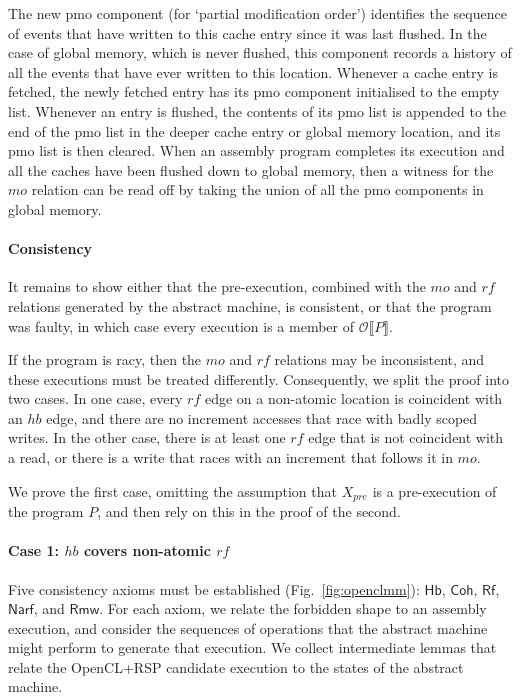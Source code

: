 \documentclass[svgnames,10pt]{sigplanconf}
\theoremstyle{definition}
\newcommand\axiom[1]{\textsf{#1}}
\newcommand\var[1]{\mathit{#1}}
\newcommand\sem[1]{\llbracket #1 \rrbracket}
\newcommand\Hsem[1]{\mathcal{O}\sem{#1}}
\newcommand\rf{\var{rf}}
\newcommand\mo{\var{mo}}
\newcommand\hb{\var{hb}}
\begin{document}
The new $\mathrm{pmo}$ component (for `partial modification order')
identifies the sequence of events that have written to this cache entry
since it was last flushed. In the case of global memory, which is
never flushed, this component records a history of all the events that
have ever written to this location. Whenever a cache entry is fetched,
the newly fetched entry has its $\mathrm{pmo}$ component
initialised to the empty list. Whenever an entry is flushed, the
contents of its $\mathrm{pmo}$ list is appended to the end of the
$\mathrm{pmo}$ list in the deeper cache entry or global memory location,
and its $\mathrm{pmo}$ list is then cleared. When an assembly program
completes its execution and all the caches have been flushed down to
global memory, then a witness for the $\var{mo}$ relation can be read
off by taking the union of all the $\mathrm{pmo}$ components in global
memory.




\paragraph{Consistency}
It remains to show either that the pre-execution, combined with the
$\mo$ and $\rf$ relations generated by the abstract machine, is
consistent, or that the program was faulty, in which case every
execution is a member of $\Hsem{P}$.

If the program is racy, then the $\mo$ and $\rf$ relations may be
inconsistent, and these executions must be treated
differently. Consequently, we split the proof into two cases. In one
case, every $\rf$ edge on a non-atomic location is coincident with an
$\hb$ edge, and there are no increment accesses that race with badly
scoped writes. In the other case, there is
at least one $\rf$ edge that is not coincident with a read, or there
is a write that races with an increment that follows it in $\mo$.

We prove the first case, omitting the assumption that $X_{\var{pre}}$
is a pre-execution of the program $P$, and then rely on this in the
proof of the second.

\paragraph{Case 1: $\hb$ covers non-atomic $\rf$}
Five consistency axioms must be established (Fig.~\ref{fig:openclmm}): $\axiom{Hb}$,
$\axiom{Coh}$, $\axiom{Rf}$, $\axiom{Narf}$, and
$\axiom{Rmw}$.
%
For each axiom, we relate the forbidden shape to an assembly
execution, and consider the sequences of operations that the abstract
machine might perform to generate that execution. We collect
intermediate lemmas that relate the OpenCL+RSP candidate execution to
the states of the abstract machine.
\end{document}
